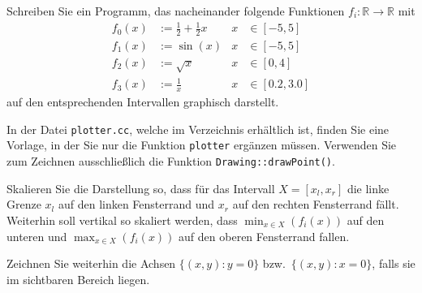 %
Schreiben Sie ein Programm, das nacheinander folgende Funktionen 
$f_i: \mathbb{R} \to \mathbb{R}$ mit
\begin{align*}
  f_0(x) & := \frac{1}{2}+\frac{1}{2}x & x &\in [-5,5]    \\
  f_1(x) & := \sin(x)                  & x &\in [-5,5]    \\
  f_2(x) & := \sqrt{x}                 & x &\in [0,4]     \\
  f_3(x) & := \frac{1}{x}              & x &\in [0.2,3.0]
\end{align*}
auf den entsprechenden Intervallen graphisch darstellt.

In der Datei \texttt{plotter.cc}, welche im Verzeichnis 
erhältlich ist, finden Sie eine Vorlage, in der Sie nur die Funktion 
\texttt{plotter} ergänzen müssen. Verwenden Sie zum Zeichnen 
ausschließlich die Funktion \texttt{Drawing::drawPoint()}.

Skalieren Sie die Darstellung so, dass für das Intervall $X=[x_l,x_r]$ 
die linke Grenze $x_l$ auf den linken Fensterrand und $x_r$ auf den 
rechten Fensterrand fällt. Weiterhin soll vertikal so skaliert werden, 
dass $\displaystyle\min_{x\in X}(f_i(x))$ auf den unteren und 
$\displaystyle\max_{x\in X}(f_i(x))$ auf den oberen Fensterrand fallen.

Zeichnen Sie weiterhin die Achsen $\{(x,y):y=0\}$ bzw.\ $\{(x,y):x=0\}$,
falls sie im sichtbaren Bereich liegen.
